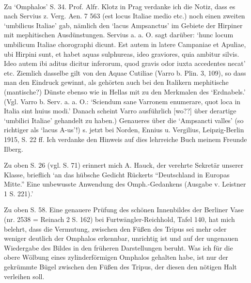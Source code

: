 \documentclass[a4paper, 11pt, oneside]{article}
\begin{document}
\paragraph{}
Zu `Omphalos' S. 34. Prof. Alfr. Klotz in Prag verdanke ich die Notiz, dass es nach Servius z. Verg. Aen. 7 563 (est locus Italiae medio etc.) noch einen zweiten `umbilicus Italiae' gab, nämlich den `lacus Ampsanctus' im Gebiete der Hirpiner mit mephitischen Ausdünstungen. Servius a. a. O. sagt darüber: `hunc locum umbilicum Italiae chorographi dicunt. Est autem in latere Campaniae et Apuliae, ubi Hirpini sunt, et habet aquas sulphureas, ideo graviores, quia ambitur silvis. Ideo autem ibi aditus dicitur inferorum, quod gravis odor iuxta accedentes necat' etc. Ziemlich dasselbe gilt von den Aquae Cutiliae (Varro b. Plin. 3, 109), so dass man den Eindruck gewinnt, als gehörten auch bei den Italikern mephitische (mantische?) Dünste ebenso wie in Hellas mit zu den Merkmalen des `Erdnabels.' (Vgl. Varro b. Serv. a. a. O.: `Sciendum sane Varronem enumerare, quot loca in Italia sint huius modi.' Danach scheint Varro ausführlich [wo??] über derartige `umbilici Italiae' gehandelt zu haben.) Genaueres über die `Ampsancti valles' (so richtiger als `lacus A-us'!) s. jetzt bei Norden, Ennius u. Vergilius, Leipzig-Berlin 1915, S. 22 ff. Ich verdanke den Hinweis auf dies lehrreiche Buch meinem Freunde Ilberg.

Zu oben S. 26 (vgl. S. 71) erinnert mich A. Hauck, der verehrte Sekretär unserer Klasse, brieflich `an das hübsche Gedicht Rückerts "`Deutschland in Europas Mitte."' Eine unbewusste Anwendung des Omph.-Gedankens (Ausgabe v. Leistner 1 S. 221).'

Zu oben S. 58. Eine genauere Prüfung des schönen Innenbildes der Berliner Vase (nr. 2538 = Reinach 2 S. 162) bei Furtwängler-Reichhold, Tafel 140, hat mich belehrt, dass die Vermutung, zwischen den Füßen des Tripus sei mehr oder weniger deutlich der Omphalos erkennbar, unrichtig ist und auf der ungenauen Wiedergabe des Bildes in den früheren Darstellungen beruht. Was ich für die obere Wölbung eines zylinderförmigen Omphalos gehalten habe, ist nur der gekrümmte Bügel zwischen den Füßen des Tripus, der diesen den nötigen Halt verleihen soll.
\end{document}

